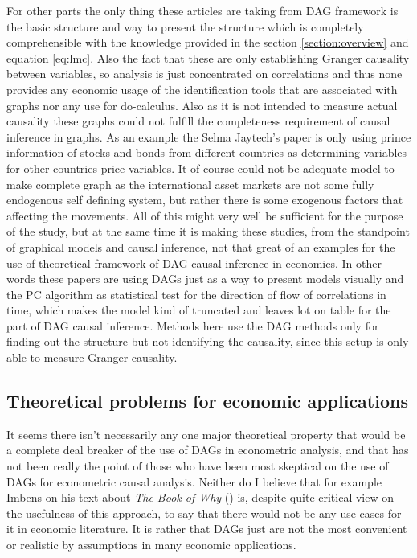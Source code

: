 \documentclass[main=english,12pt,a4paper,pdftex,econ,utf8]{aaltothesis}
\begin{document}
For other parts the only thing these articles are taking from DAG framework is the basic structure and way to present the structure which is completely comprehensible with the knowledge provided in the section \ref{section:overview} and equation \ref{eq:lmc}.
Also the fact that these are only establishing Granger causality between variables, so analysis is just concentrated on correlations and thus none provides any economic usage of the identification tools that are associated with graphs nor any use for do-calculus. Also as it is not intended to measure actual causality these graphs could not fulfill the completeness requirement of causal inference in graphs. As an example the Selma Jaytech's paper is only using prince information of stocks and bonds from different countries as determining variables for other countries price variables. It of course could not be adequate model to make complete graph as the international asset markets are not some fully endogenous self defining system, but rather there is some exogenous factors that affecting the movements. All of this might very well be sufficient for the purpose of the study, but at the same time it is making these studies, from the standpoint of graphical models and causal inference, not that great of an examples for the use of theoretical framework of DAG causal inference in economics. In other words these papers are using DAGs just as a way to present models visually and the PC algorithm as statistical test for the direction of flow of correlations in time, which makes the model kind of truncated and leaves lot on table for the part of DAG causal inference. Methods here use the DAG methods only for finding out the structure but not identifying the causality, since this setup is only able to measure Granger causality.

\subsection{Theoretical problems for economic applications}\label{subsection:problems}

It seems there isn't necessarily any one major theoretical property that would be a complete deal breaker of the use of DAGs in econometric analysis, and that has not been really the point of those who have been most skeptical on the use of DAGs for econometric causal analysis. Neither do I believe that for example Imbens on his text about \textit{The Book of Why} (\cite{PearlMackenzie18}) is, despite quite critical view on the usefulness of this approach, to say that there would not be any use cases for it in economic literature. It is rather that DAGs just are not the most convenient or realistic by assumptions in many economic applications.
\end{document}
